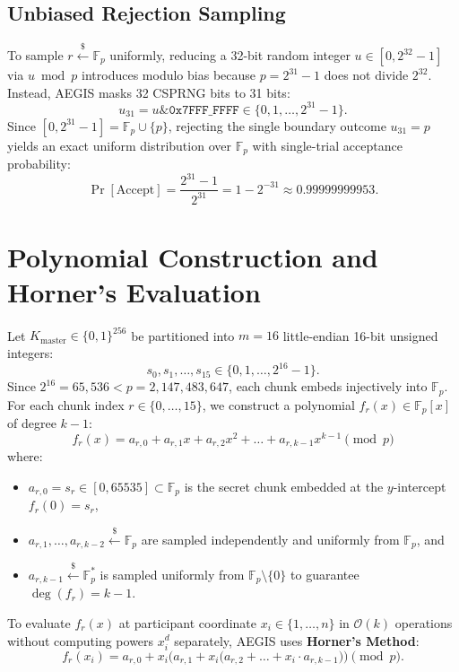 \documentclass[11pt,a4paper]{article}
\theoremstyle{definition}
\newcommand{\Fp}{\mathbb{F}_p}
\newcommand{\Fps}{\mathbb{F}_p^*}
\begin{document}
\subsection{Unbiased Rejection Sampling}
To sample $r \xleftarrow{\$} \Fp$ uniformly, reducing a 32-bit random integer $u \in [0, 2^{32}-1]$ via $u \bmod p$ introduces modulo bias because $p = 2^{31}-1$ does not divide $2^{32}$. Instead, AEGIS masks 32 CSPRNG bits to 31 bits:
\[
    u_{31} = u \mathbin{\&} \texttt{0x7FFF\_FFFF} \in \{0, 1, \dots, 2^{31}-1\}.
\]
Since $[0, 2^{31}-1] = \Fp \cup \{p\}$, rejecting the single boundary outcome $u_{31} = p$ yields an exact uniform distribution over $\Fp$ with single-trial acceptance probability:
\[
    \Pr[\text{Accept}] = \frac{2^{31}-1}{2^{31}} = 1 - 2^{-31} \approx 0.99999999953.
\]

\section{Polynomial Construction and Horner's Evaluation}

Let $K_{\mathrm{master}} \in \{0,1\}^{256}$ be partitioned into $m = 16$ little-endian 16-bit unsigned integers:
\[
    s_0, s_1, \dots, s_{15} \in \{0, 1, \dots, 2^{16}-1\}.
\]
Since $2^{16} = 65,536 < p = 2,147,483,647$, each chunk embeds injectively into $\Fp$. For each chunk index $r \in \{0, \dots, 15\}$, we construct a polynomial $f_r(x) \in \Fp[x]$ of degree $k - 1$:
\begin{equation}
    f_r(x) = a_{r,0} + a_{r,1} x + a_{r,2} x^2 + \dots + a_{r,k-1} x^{k-1} \pmod p
\end{equation}
where:
\begin{itemize}
    \item $a_{r,0} = s_r \in [0, 65535] \subset \Fp$ is the secret chunk embedded at the $y$-intercept $f_r(0) = s_r$,
    \item $a_{r,1}, \dots, a_{r,k-2} \xleftarrow{\$} \Fp$ are sampled independently and uniformly from $\Fp$, and
    \item $a_{r,k-1} \xleftarrow{\$} \Fps$ is sampled uniformly from $\Fp \setminus \{0\}$ to guarantee $\deg(f_r) = k - 1$.
\end{itemize}

To evaluate $f_r(x)$ at participant coordinate $x_i \in \{1, \dots, n\}$ in $\mathcal{O}(k)$ operations without computing powers $x_i^d$ separately, AEGIS uses \textbf{Horner's Method}:
\begin{equation}
    f_r(x_i) = a_{r,0} + x_i \Big( a_{r,1} + x_i \big( a_{r,2} + \dots + x_i \cdot a_{r,k-1} \big) \Big) \pmod p.
\end{equation}
\end{document}
